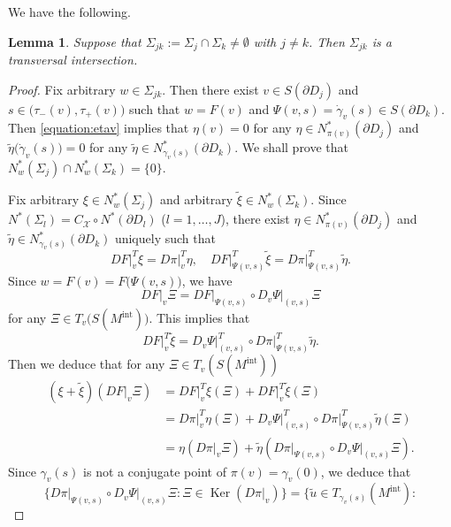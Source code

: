 \documentclass[a4paper,11pt,reqno]{amsart}
\numberwithin{equation}{section}
\newtheorem{lemma}[theorem]{Lemma}
\theoremstyle{definition}
\theoremstyle{remark}
\begin{document}
%
%
We have the following. 
%
%
\begin{lemma}
\label{theorem:4-3}
Suppose that $\Sigma_{jk}:=\Sigma_{j}\cap\Sigma_k\ne\emptyset$ with $j{\ne}k$. 
Then  $\Sigma_{jk}$ is a transversal intersection. 
\end{lemma}
%
%
\begin{proof}
Fix arbitrary $w \in \Sigma_{jk}$. Then there exist 
$v \in S(\partial{D_j})$ and $s\in\bigl(\tau_-(v),\tau_+(v)\bigr)$ such that 
$w=F(v)$ and $\Psi(v,s)=\dot{\gamma}_v(s) \in S(\partial{D_k})$.  Then \eqref{equation:etav} implies that 
$\eta(v)=0$ for any $\eta \in N^\ast_{\pi(v)}(\partial{D_j})$ and 
$\tilde{\eta}\bigl(\dot{\gamma}_v(s)\bigr)=0$ for any $\tilde{\eta} \in N^\ast_{\gamma_v(s)}(\partial{D_k})$. 
We shall prove that $N^\ast_w(\Sigma_j){\cap}N^\ast_w(\Sigma_k)=\{0\}$.
%
%
\par
%
%
Fix arbitrary $\xi \in N^\ast_w(\Sigma_j)$ and arbitrary $\tilde{\xi} \in N^\ast_w(\Sigma_k)$.  
Since $N^\ast(\Sigma_l)=C_\mathcal{X}{\circ}N^\ast(\partial{D_l})$ ($l=1,\dotsc,J$), 
there exist $\eta \in N^\ast_{\pi(v)}(\partial{D_j})$ and $\tilde{\eta} \in N^\ast_{\gamma_v(s)}(\partial{D_k})$ 
uniquely such that 
%
%
$$
DF\vert^T_v\xi=D\pi\vert^T_v\eta,
\quad
DF\vert^T_{\Psi(v,s)}\tilde{\xi}=D\pi\vert^T_{\Psi(v,s)}\tilde{\eta}.
$$
%
%
Since $w=F(v)=F\bigl(\Psi(v,s)\bigr)$, we have 
%
%
$$
DF\vert_v\Xi=DF\vert_{\Psi(v,s)}{\circ}D_v\Psi\vert_{(v,s)}\Xi
$$
%
%
for any $\Xi \in T_v\bigl(S(M^\text{int})\bigr)$. This implies that
%
%
\begin{equation}
DF\vert^T_v\tilde{\xi}
=
D_v\Psi\vert^T_{(v,s)}{\circ}D\pi\vert^T_{\Psi(v,s)}\tilde{\eta}. 
\label{equation:tildexitildeeta} 
\end{equation}
%
%
Then we deduce that for any $\Xi \in T_v(S(M^\text{int}))$  
%
%
\begin{align}
  (\xi+\tilde{\xi})(DF\vert_v\Xi)
& =
  DF\vert^T_v\xi(\Xi)+DF\vert^T_v\tilde{\xi}(\Xi)
\nonumber
\\
& =
  D\pi\vert^T_v\eta(\Xi)+D_v\Psi\vert^T_{(v,s)}{\circ}D\pi\vert^T_{\Psi(v,s)}\tilde{\eta}(\Xi)
\nonumber
\\
& =
  \eta(D\pi\vert_v\Xi)+\tilde{\eta}(D\pi\vert_{\Psi(v,s)}{\circ}D_v\Psi\vert_{(v,s)}\Xi).
\label{equation:xitildexi}
\end{align}
%
%
Since $\gamma_v(s)$ is not a conjugate point of $\pi(v)=\gamma_v(0)$, we deduce that 
%
%
$$
\{
D\pi\vert_{\Psi(v,s)}{\circ}D_v\Psi\vert_{(v,s)}\Xi: 
\Xi \in \operatorname{Ker}(D\pi\vert_v)
\}
=
\{
\tilde{u} \in T_{\gamma_v(s)}(M^\text{int}): 
$$
\end{proof}
\end{document}

